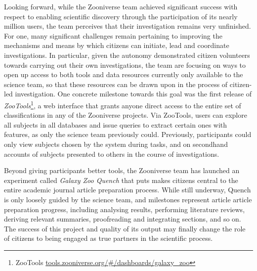 \documentclass{sigchi}
\begin{document}

Looking forward, while the Zooniverse team achieved significant success with respect to enabling scientific discovery through the participation of its nearly million users, the team perceives that their investigation remains very unfinished.  For one, many significant challenges remain pertaining to improving the mechanisms and means by which citizens can initiate, lead and coordinate investigations.  In particular, given the autonomy demonstrated citizen volunteers towards carrying out their own investigations, the team are focusing on ways to open up access to both tools and data resources currently only available to the science team, so that these resources can be drawn upon in the process of citizen-led investigation.  One concrete milestone towards this goal was the first release of \emph{ZooTools}\footnote{ZooTools \url{tools.zooniverse.org/\#/dashboards/galaxy_zoo}}, a web interface that grants anyone direct access to the entire set of classifications in any of the Zooniverse projects.  Via ZooTools, users can explore all subjects in all databases and issue queries to extract certain ones with features, as only the science team previously could.  Previously, participants could only view subjects chosen by the system during tasks, and on secondhand accounts of subjects presented to others in the course of investigations.

Beyond giving participants better tools, the Zooniverse team has launched an experiment called \emph{Galaxy Zoo Quench} that puts makes citizens central to the entire academic journal article preparation process.  While still underway, Quench is only loosely guided by the science team, and milestones represent article article preparation progress, including analysing results, performing literature reviews, deriving relevant summaries, proofreading and integrating sections, and so on.  The success of this project and quality of its output may finally change the role of citizens to being engaged as true partners in the scientific process. 
\end{document}
